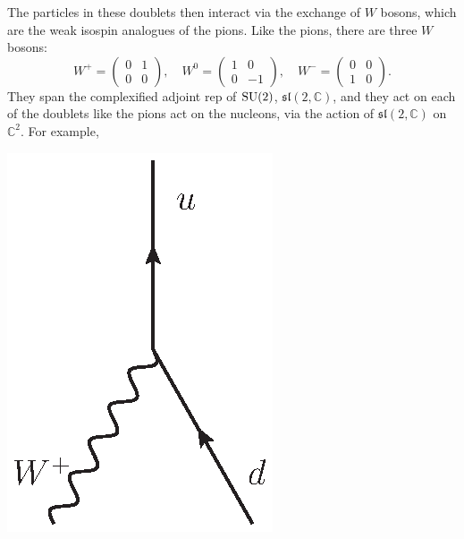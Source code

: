 \documentclass[12pt]{article}
\newcommand{\C}{{\mathbb C}}  %
\newcommand{\SU}{{\rm SU}}    %
\renewcommand{\sl}{\mathfrak{sl}} %
\begin{document}
The particles in these doublets then interact via the exchange of $W$ bosons,
which are the weak isospin analogues of the pions. Like the pions, there are
three $W$ bosons:
\[ W^+ = \left(\begin{array}{cc} 0 & 1 \\ 0 & 0 \end{array} \right), \quad  
W^0 = \left(\begin{array}{cc} 1 & 0 \\ 0 & -1 \end{array} \right), \quad
W^- = \left(\begin{array}{cc} 0 & 0 \\ 1 & 0 \end{array} \right). \]
They span the complexified adjoint rep of $\SU(2)$, $\sl(2, \C)$, and they act
on each of the doublets like the pions act on the nucleons, via the action of
$\sl(2,\C)$ on $\C^2$. For example,
\begin{center}
	\includegraphics[scale=0.75]{W+d_vertex}
\end{center}
\end{document}
